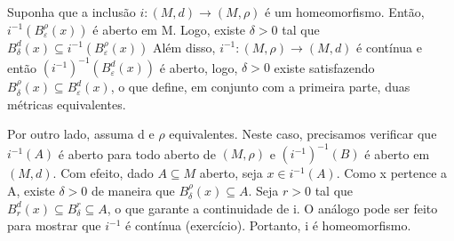 \documentclass[MetricSpaces/metric_notes.tex]{subfiles}
\begin{document}
\begin{proof*}
	Suponha que a inclusão \(i:(M, d)\rightarrow (M, \rho )\) é um homeomorfismo. Então,
	\(i^{-1}(B_{\varepsilon }^{\rho }(x))\) é aberto em M. Logo, existe \(\delta > 0\) tal que
	\(B_{\delta }^{d}(x) \subseteq{i^{-1}(B_{\varepsilon }^{\rho }(x))}\)
	Além disso, \(i^{-1}:(M, \rho )\rightarrow (M, d)\) é contínua e então \((i^{-1})^{-1}(B_{\varepsilon }^{d}(x))\)
	é aberto, logo, \(\delta >0\) existe satisfazendo \(B_{\delta }^{\rho }(x) \subseteq{B_{\varepsilon }^{d}(x)}\), o
	que define, em conjunto com a primeira parte, duas métricas equivalentes.

	Por outro lado, assuma d e \(\rho \) equivalentes. Neste caso, precisamos verificar
	que \(i^{-1}(A)\) é aberto para todo aberto de \((M, \rho) \) e \((i^{-1})^{-1}(B)\) é aberto em \((M, d)\).
	Com efeito, dado \(A\subseteq{M}\) aberto, seja \(x\in i^{-1}(A)\). Como x pertence a A, existe \(\delta >0\) de
	maneira que \(B_{\delta }^{\rho }(x)\subseteq{A}.\) Seja \(r > 0\) tal que \(B_{r}^{d}(x)\subseteq{B_{\delta }^{r}}\subseteq{A}\),
	o que garante a continuidade de i. O análogo pode ser feito para mostrar que \(i^{-1}\) é contínua (exercício).
	Portanto, i é homeomorfismo. \qedsymbol
\end{proof*}
\end{document}
